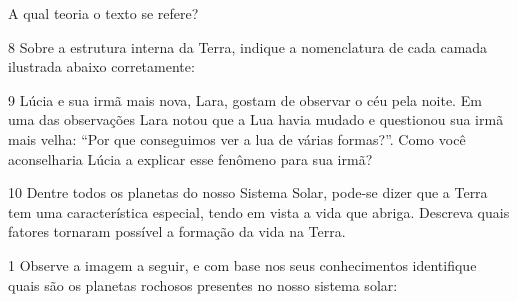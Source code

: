 A qual teoria o texto se refere?



\num{8} Sobre a estrutura interna da Terra, indique a nomenclatura de cada camada ilustrada abaixo corretamente:





\num{9}  Lúcia e sua irmã mais nova, Lara, gostam de observar o céu pela noite.
  Em uma das observações Lara notou que a Lua havia mudado e questionou
  sua irmã mais velha: ``Por que conseguimos ver a lua de várias
  formas?''. Como você aconselharia Lúcia a explicar esse fenômeno para
  sua irmã?



\num{10}  Dentre todos os planetas do nosso Sistema Solar, pode-se dizer que a
  Terra tem uma característica especial, tendo em vista a vida que
  abriga. Descreva quais fatores tornaram possível a formação da vida na
  Terra.




\num{1} Observe a imagem a seguir, e com base nos seus conhecimentos identifique quais são os planetas rochosos presentes no nosso sistema solar:



